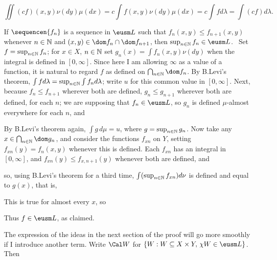 {$$\iint(cf)(x,y)\nu(dy)\mu(dx)
=c\int f(x,y)\nu(dy)\mu(dx)
=c\int fd\lambda
=\int(cf)d\lambda.$$

\medskip

 If $\sequencen{f_n}$ is a sequence in $\eusm L$ such
that $f_n(x,y)\le f_{n+1}(x,y)$ whenever $n\in\Bbb N$ and
$(x,y)\in\dom f_n\cap\dom f_{n+1}$, then $\sup_{n\in\Bbb N}f_n\in\eusm
L$.   \Prf\
Set $f=\sup_{n\in\Bbb N}f_n$;  for $x\in X$, $n\in\Bbb N$ set
$g_n(x)=\int f_n(x,y)\nu(dy)$ when the integral is defined in
$[0,\infty]$.   Since here I am allowing $\infty$ as a value of a
function, it is natural to regard $f$ as defined on $\bigcap_{n\in\Bbb
N}\dom f_n$.   By
B.Levi's theorem, $\int fd\lambda=\sup_{n\in\Bbb N}\int f_nd\lambda$;
write $u$ for this common value in $[0,\infty]$.   Next,
because $f_n\le f_{n+1}$ wherever both are defined, $g_n\le g_{n+1}$
wherever both are defined, for each $n$;   we are supposing that
$f_n\in\eusm L$, so $g_n$ is defined $\mu$-almost everywhere for each
$n$, and


\noindent By B.Levi's theorem again, $\int g\,d\mu=u$, where
$g=\sup_{n\in\Bbb N}g_n$.   Now take any $x\in\bigcap_{n\in\Bbb N}\dom
g_n$, and consider the functions $f_{xn}$ on $Y$, setting
$f_{xn}(y)=f_n(x,y)$ whenever this is defined.   Each $f_{xn}$ has an
integral in $[0,\infty]$, and $f_{xn}(y)\le f_{x,n+1}(y)$ whenever both
are defined, and


\noindent so, using B.Levi's theorem for a third time,
$\int(\sup_{n\in\Bbb
N}f_{xn})d\nu$ is defined and equal to $g(x)$, that is,


\noindent This is true for almost every $x$, so


\noindent Thus $f\in\eusm L$, as claimed.\ \Qed

\medskip

 The expression of the ideas in the next section of the
proof will go more smoothly if I introduce another term.   Write
$\Cal W$ for $\{W:W\subseteq X\times Y,\,\chi W\in\eusm L\}$.   Then

\inset{($\alpha$) if $W$, $W'\in\Cal W$ and $W\cap W'=\emptyset$,
$W\cup W'\in\Cal W$}

}
